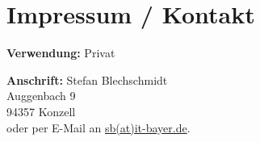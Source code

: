 \label{kap:impressum-kontakt}
\chapter{Impressum / Kontakt}

\textbf{Verwendung:}
Privat

\textbf{Anschrift:}
Stefan Blechschmidt\\Auggenbach 9\\94357 Konzell
\\
oder per E-Mail an \href{mailto:sb@it-bayer.de}{sb(at)it-bayer.de}.

